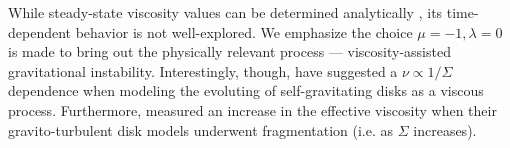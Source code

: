 While steady-state viscosity values can be determined analytically
\citep[e.g.][]{rafikov15}, its time-dependent behavior is not
well-explored. We emphasize the choice $\mu=-1,\lambda=0$ is made to
bring out the physically relevant process --- viscosity-assisted
gravitational instability. %
Interestingly, though, \cite{laughlin96b} have suggested a $\nu \propto 1/\Sigma$
dependence when modeling the evoluting of self-gravitating disks 
as a viscous process. Furthermore, \cite{paardekooper12} measured
an increase in the effective viscosity when their gravito-turbulent
disk models underwent fragmentation (i.e. as $\Sigma$ increases).  


